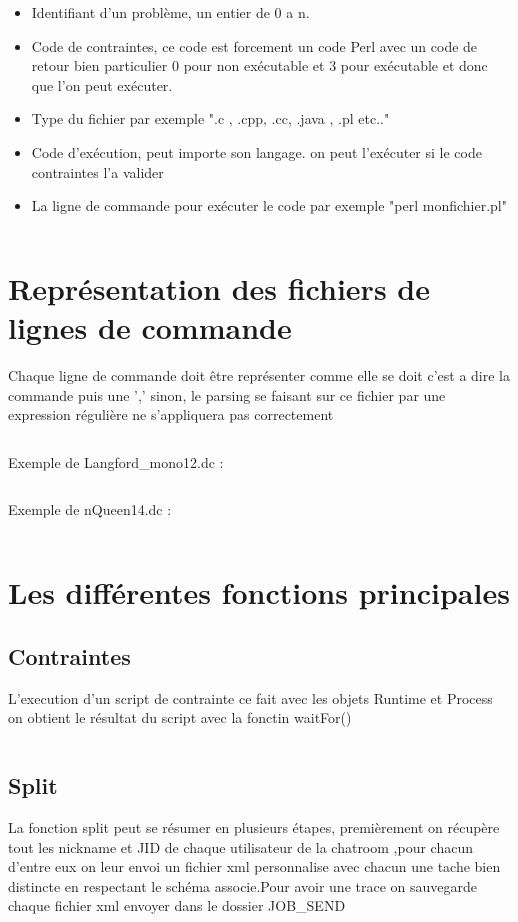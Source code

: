 \documentclass[11pt]{report}
\begin{document}
\begin{itemize}
\item Identifiant d'un problème, un entier de 0 a n.
\item Code de contraintes, ce code est forcement un code Perl avec un code de retour bien particulier 0 pour non exécutable  et 3 pour exécutable et donc que l'on peut exécuter. 
\item Type du fichier par exemple ".c , .cpp, .cc, .java , .pl etc.."
\item Code d'exécution, peut importe son langage. on peut l'exécuter si le code contraintes l'a valider 
\item La ligne de commande pour exécuter le code par exemple "perl monfichier.pl"
\end{itemize}

\inputminted{XML}{../Schema_XML/BDD_JOB.xsd}
\newpage 

\section{Représentation des fichiers de lignes de commande} 
Chaque ligne de commande doit être représenter comme elle se doit c'est a dire la commande puis une ',' sinon, le parsing se faisant sur ce fichier par une expression régulière ne s\textquoteright appliquera pas correctement  
\inputminted{perl}{../Echantillon_Script_Cmd/Toto.dc}
Exemple de Langford\_mono12.dc :
\inputminted{perl}{../Echantillon_Script_Cmd/Langford_mono12.dc}
Exemple de nQueen14.dc :
\inputminted{perl}{../Echantillon_Script_Cmd/nQuenn14.dc}
\newpage
\section{Les différentes fonctions principales}

\subsection{Contraintes} 
L'execution d'un script de contrainte ce fait avec les objets Runtime et Process on obtient le résultat du script avec la fonctin waitFor() 
\inputminted{perl}{../Echantillon_Script_Perl/OSname.pl}
\newpage
\subsection{Split} 
La fonction split peut se résumer en plusieurs étapes, premièrement on récupère tout les nickname et JID de chaque utilisateur de la chatroom ,pour chacun d'entre eux on leur envoi un fichier xml personnalise avec chacun une tache bien distincte en respectant le schéma associe.Pour avoir une trace on sauvegarde chaque fichier xml envoyer dans le dossier JOB\_SEND
\inputminted[tabsize=2,frame=lines,linenos]{java}{Fichier_import/split.java}
\end{document}
